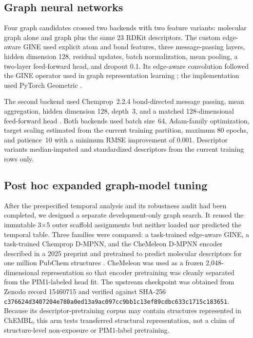 \documentclass[11pt]{article}
\begin{document}
\subsection{Graph neural networks}

Four graph candidates crossed two backends with two feature variants: molecular
graph alone and graph plus the same 23 RDKit descriptors. The custom edge-aware
GINE used explicit atom and bond features, three message-passing layers, hidden
dimension 128, residual updates, batch normalization, mean pooling, a two-layer
feed-forward head, and dropout 0.1. Its edge-aware convolution followed the GINE
operator used in graph representation learning \citep{hu2020strategies}; the
implementation used PyTorch Geometric \citep{fey2019pyg}.

The second backend used Chemprop~2.2.4 bond-directed message passing, mean
aggregation, hidden dimension 128, depth~3, and a matched 128-dimensional
feed-forward head \citep{yang2019analyzing,graff2026chempropv2}. Both backends used batch size~64,
Adam-family optimization, target scaling estimated from the current training
partition, maximum 80 epochs, and patience~10 with a minimum RMSE improvement of
0.001. Descriptor variants median-imputed and standardized descriptors from the
current training rows only.

\subsection{Post hoc expanded graph-model tuning}

After the prespecified temporal analysis and its robustness audit had been
completed, we designed a separate development-only graph search. It reused the
immutable 3$\times$5 outer scaffold assignments but neither loaded nor predicted
the temporal table. Three families were compared: a task-trained edge-aware
GINE, a task-trained Chemprop D-MPNN, and the CheMeleon D-MPNN encoder described
in a 2025 preprint and pretrained to predict molecular descriptors for one
million PubChem structures \citep{burns2025chemeleon}. CheMeleon was used as a
frozen 2,048-dimensional
representation so that encoder pretraining was cleanly separated from the
PIM1-labeled head fit. The upstream checkpoint was obtained from Zenodo record
15460715 \citep{burns2025chemeleonmodel} and verified against SHA-256
\nolinkurl{c376624d3407204e780a0ed13a9ac097cc9bb1c13ef89cdbc633c1715c183651}.
Because its descriptor-pretraining corpus may contain structures represented in
ChEMBL, this arm tests transferred structural representation, not a claim of
structure-level non-exposure or PIM1-label pretraining.
\end{document}
